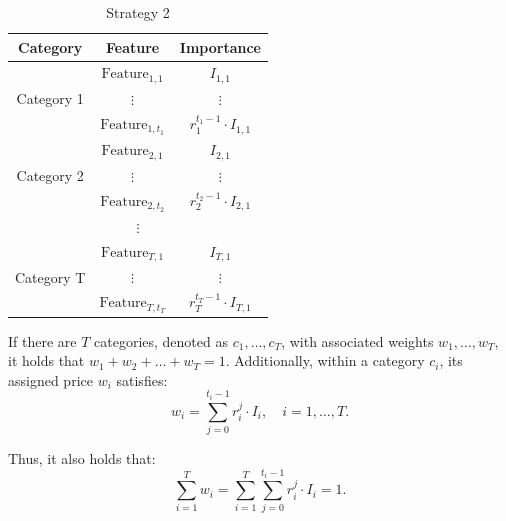 \documentclass[12pt]{book}
\begin{document}
\begin{enumerate}
    \begin{table}[H]
    \centering
    \begin{tabular}{@{}ccc@{}}
    \toprule
    \textbf{Category}           & \textbf{Feature}   & \textbf{Importance}                                     \\ \midrule
    \multirow{3}{*}{Category 1} & $\text{Feature}_{1,1}$    & $I_{1,1}$                                                    \\
                                & $\vdots$           & $\vdots$                                                \\
                                & $\text{Feature}_{1,t_1}$ & $r_1^{t_1-1} \cdot I_{1,1}$ \\ \midrule
    \multirow{3}{*}{Category 2} & $\text{Feature}_{2,1}$    & $I_{2,1}$                                                    \\
                                & $\vdots$           & $\vdots$                                                \\
                                & $\text{Feature}_{2,t_2}$ & $r_2^{t_2-1} \cdot I_{2,1}$ \\ \midrule
    \multicolumn{3}{c}{$\vdots$}                                                                                    \\ \midrule
    \multirow{3}{*}{Category T} & $\text{Feature}_{T,1}$    & $I_{T,1}$                                                    \\
                                & $\vdots$           & $\vdots$                                                \\
                                & $\text{Feature}_{T,t_T}$ & $r_T^{t_T-1} \cdot I_{T,1}$ \\ \bottomrule
    \end{tabular}
    \caption{Strategy 2}
    \label{tab:strat_two}
    \end{table}

    
   If there are $T$ categories, denoted as $c_1, \ldots, c_T$, with associated weights $w_1, \ldots, w_T$, it holds that $w_1 + w_2 + \ldots + w_T = 1$. Additionally, within a category $c_i$, its assigned price $w_i$ satisfies:
    \[
    w_i = \sum_{j=0}^{t_i-1} r_i^j \cdot I_i, \quad i = 1, \ldots, T.
    \]
    
    Thus, it also holds that:
    \[
    \sum_{i=1}^{T} w_i = \sum_{i=1}^{T} \sum_{j=0}^{t_i-1} r_i^j \cdot I_i = 1.
    \]
\end{enumerate}
\end{document}
